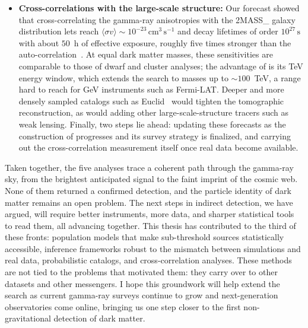 \begin{itemize}
    \item \textbf{Cross-correlations with the large-scale structure:} Our
    forecast showed that cross-correlating the gamma-ray anisotropies with the
    \gls{2MASS_} galaxy distribution lets \CTAO reach $\langle\sigma v\rangle \sim
    10^{-23}\,\mathrm{cm^{3}\,s^{-1}}$ and decay lifetimes of order
    $10^{27}\,\mathrm{s}$ with about $50$~h of effective exposure, roughly
    five times stronger than the auto-correlation~\cite{Pinetti:2025hgd}. At
    equal dark matter masses, these sensitivities are comparable to those of
    dwarf and cluster analyses; the advantage of \CTAO is its TeV energy
    window, which extends the search to masses up to $\sim 100$~TeV, a range
    hard to reach for GeV instruments such as Fermi-LAT. Deeper and more densely sampled
    catalogs such as Euclid~\cite{2024arXiv240513491E} would tighten the
    tomographic reconstruction, as would adding other large-scale-structure
    tracers such as weak lensing. Finally, two steps lie ahead: updating these
    forecasts as the construction of \CTAO progresses and its survey strategy is
    finalized, and carrying out the cross-correlation measurement itself once
    real data become available.
\end{itemize}

Taken together, the five analyses trace a coherent path through the gamma-ray
sky, from the brightest anticipated signal to the faint imprint of the cosmic
web. None of them returned a confirmed detection, and the particle identity of
dark matter remains an open problem. The next steps in indirect detection, we
have argued, will require better instruments, more data, and sharper
statistical tools to read them, all advancing together. This thesis has
contributed to the third of these fronts: population models that make
sub-threshold sources statistically accessible, inference frameworks robust to
the mismatch between simulations and real data, probabilistic catalogs, and
cross-correlation analyses. These methods are not tied to the problems that
motivated them: they carry over to other datasets and other messengers. 
I hope this groundwork will help extend the search as current gamma-ray surveys
continue to grow and next-generation observatories come online, bringing us one step closer to the
first non-gravitational detection of dark matter.


